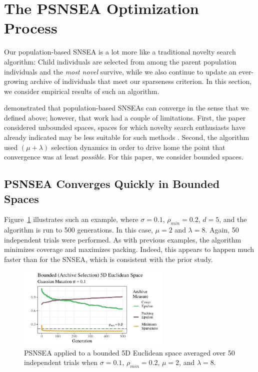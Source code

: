 \documentclass[twoside]{article}
\begin{document}
\section{The PSNSEA Optimization Process}
\label{sec:resultpsnesea}

Our population-based SNSEA is a lot more like a traditional novelty search algorithm:  Child individuals are selected from among the parent population individuals and the \emph{most novel} survive, while we also continue to update an ever-growing archive of individuals that meet our sparseness criterion.  In this section, we consider empirical results of such an algorithm.

\citet{Wiegand2021flairs} demonstrated that population-based SNSEAs can converge in the sense that we defined above; however, that work had a couple of limitations.  First, the paper considered unbounded spaces, spaces for which novelty search enthusiasts have already indicated may be less suitable for such methods \citep{LehmanStanley2008ssls}.  Second, the algorithm used $(\mu+\lambda)$ selection dynamics in order to drive home the point that convergence was at least \emph{possible}.  For this paper, we consider bounded spaces. 


\subsection{PSNSEA Converges Quickly in Bounded Spaces}
\label{subsec:psnsea:bounded}

Figure~\ref{fig:bounded:mu2lam8:0102} illustrates such an example, where $\sigma=0.1$, $\rho_{min}= 0.2$, $d=5$, and the algorithm is run to 500 generations.  In this case, $\mu=2$ and $\lambda=8$.  Again, 50 independent trials were performed.  As with previous examples, the algorithm minimizes coverage and maximizes packing.  Indeed, this appears to happen much faster than for the SNSEA, which is consistent with the prior study.
%
\begin{figure}[ht]
  \center\includegraphics[width=0.65\textwidth]{Figures/bounded-500-s01r02-mu2lam8.pdf}
  \caption{\label{fig:bounded:mu2lam8:0102} PSNSEA applied to a bounded 5D Euclidean space averaged over 50 independent trials when $\sigma=0.1$, $\rho_{min}=0.2$, $\mu=2$, and $\lambda=8$.}
\end{figure}
\end{document}
